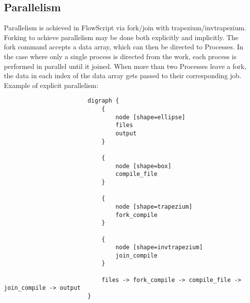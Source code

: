 \documentclass{article}
\begin{document}
			\subsection{Parallelism}
				Parallelism is achieved in FlowScript via fork/join with trapezium/invtrapezium. Forking to achieve parallelism may be done both explicitly and implicitly. The fork command accepts a data array, which can then be directed to Processes. In the case where only a single process is directed from the work, each process is performed in parallel until it joined. When more than two Processes leave a fork, the data in each index of the data array gets passed to their corresponding job. Example of explicit parallelism:
					\begin{verbatim}
						digraph {
						    {
						        node [shape=ellipse]
						        files
						        output
						    }

						    {
						        node [shape=box]
						        compile_file
						    }
    
						    {
						        node [shape=trapezium]
						        fork_compile
						    }

						    {
						        node [shape=invtrapezium]
						        join_compile
						    }

						    files -> fork_compile -> compile_file -> join_compile -> output
						}
					\end{verbatim}
\end{document}

